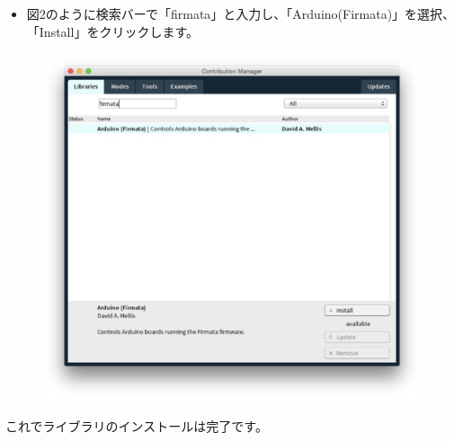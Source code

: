 \documentclass[11pt,a4paper]{jarticle}
\begin{document}
\newpage

\begin{itemize}
\item 図2のように検索バーで「firmata」と入力し、「Arduino(Firmata)」を選択、「Install」をクリックします。
\end{itemize}

\begin{figure}[htbp]
  \centering
  \includegraphics[width=0.6\columnwidth]{img/eps/how_to_install_the_Firmata_library2.eps}
  \label{figure:switch}
\end{figure}

これでライブラリのインストールは完了です。




\end{document}
